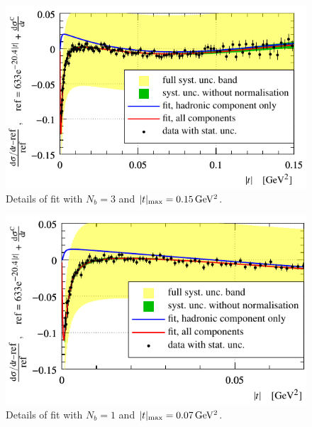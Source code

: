 \begin{figure}
\vskip-5mm
\begin{center}
\includegraphics{fig/fit_details_exp3_0p15.pdf}
\vskip-2mm
\caption{%
Details of fit with $N_b = 3$ and $|t|_{\rm max} = 0.15\,{\rm GeV^2}$.
}
\label{fig:fit exp3 0.15}
\end{center}
\end{figure}


\begin{figure}
\vskip-5mm
\begin{center}
\includegraphics{fig/fit_details_exp1_0p07.pdf}
\vskip-2mm
\caption{%
Details of fit with $N_b = 1$ and $|t|_{\rm max} = 0.07\,{\rm GeV^2}$.
}
\label{fig:fit exp1 0.07}
\end{center}
\end{figure}

